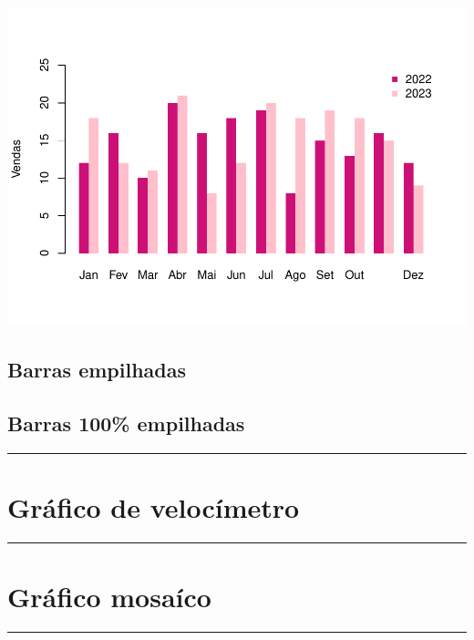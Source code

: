 \documentclass[
]{book}
\begin{document}
\begin{center}\includegraphics{AED_files/figure-latex/unnamed-chunk-3-1} \end{center}

\subsection{Barras empilhadas}\label{barras-empilhadas}

\subsection{Barras 100\% empilhadas}\label{barras-100-empilhadas}

\begin{center}\rule{0.5\linewidth}{0.5pt}\end{center}

\section{Gráfico de velocímetro}\label{gruxe1fico-de-velocuxedmetro}

\begin{center}\rule{0.5\linewidth}{0.5pt}\end{center}

\section{Gráfico mosaíco}\label{gruxe1fico-mosauxedco}

\begin{center}\rule{0.5\linewidth}{0.5pt}\end{center}
\end{document}
